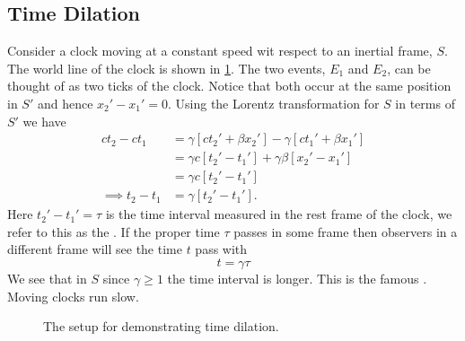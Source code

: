 \documentclass[fleqn]{NotesClass}
\begin{document}
    \subsection{Time Dilation}
    Consider a clock moving at a constant speed wit respect to an inertial frame, \(S\).
    The world line of the clock is shown in \cref{fig:minkowski time dilation}.
    The two events, \(E_1\) and \(E_2\), can be thought of as two ticks of the clock.
    Notice that both occur at the same position in \(S'\) and hence \(x_2' - x_1' = 0\).
    Using the Lorentz transformation for \(S\) in terms of \(S'\) we have
    \begin{align}
        ct_2 - ct_1 &= \gamma [ct_2' + \beta x_2'] - \gamma [ct_1' + \beta x_1']\\
        &= \gamma c [t_2' - t_1'] + \gamma \beta [x_2' - x_1']\\
        &= \gamma c [t_2' - t_1']\\
        \implies t_2 - t_1 &= \gamma [t_2' - t_1'].
    \end{align}
    Here \(t_2' - t_1' = \tau\) is the time interval measured in the rest frame of the clock, we refer to this as the .
    If the proper time \(\tau\) passes in some frame then observers in a different frame will see the time \(t\) pass with
    \begin{equation}\label{eqn:time dilation}
        t = \gamma\tau
    \end{equation}
    We see that in \(S\) since \(\gamma \ge 1\) the time interval is longer.
    This is the famous .
    Moving clocks run slow.
    
    \begin{figure}
        \caption{The setup for demonstrating time dilation.}
        \label{fig:minkowski time dilation}
    \end{figure}
\end{document}
